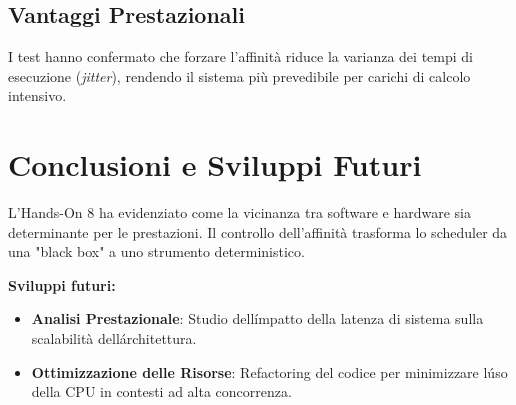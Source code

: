 \documentclass[a4paper,12pt]{article}
\begin{document}
\subsection{Vantaggi Prestazionali}
I test hanno confermato che forzare l'affinità riduce la varianza dei tempi di esecuzione (\textit{jitter}), rendendo il sistema più prevedibile per carichi di calcolo intensivo.

\section{Conclusioni e Sviluppi Futuri}
L'Hands-On 8 ha evidenziato come la vicinanza tra software e hardware sia determinante per le prestazioni. Il controllo dell'affinità trasforma lo scheduler da una "black box" a uno strumento deterministico.

\noindent \textbf{Sviluppi futuri:}
\begin{itemize}
    \item \textbf{Analisi Prestazionale}: Studio dell\'impatto della latenza di sistema sulla scalabilità dell\'architettura.
    \item \textbf{Ottimizzazione delle Risorse}: Refactoring del codice per minimizzare l\'uso della CPU in contesti ad alta concorrenza.
\end{itemize}
\end{document}
